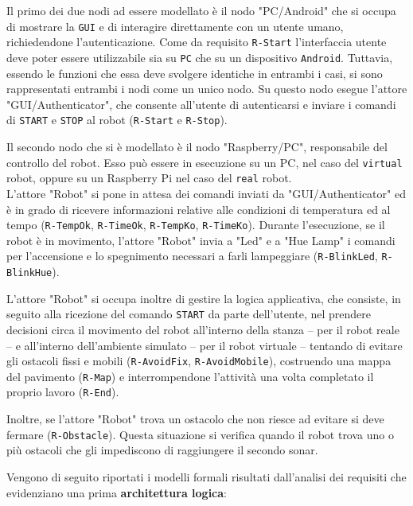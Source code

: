 \documentclass{llncs}
\newcommand{\version}{7}
\newcommand{\action}[1]{\texttt{#1}\xspace}
\newcommand{\code}[1]{{\color{blue}\small{\texttt{#1}}}}
\newcommand{\fname}[1]{{\color{magenta}\small{\texttt{#1}}}}
\begin{document}
Il primo dei due nodi ad essere modellato è il nodo "PC/Android" che si occupa di mostrare la \action{GUI} e di interagire direttamente con un utente umano, richiedendone l'autenticazione. Come da requisito \code{R-Start} l'interfaccia utente deve poter essere utilizzabile sia su \action{PC} che su un dispositivo \action{Android}. Tuttavia, essendo le funzioni che essa deve svolgere identiche in entrambi i casi, si sono rappresentati entrambi i nodi come un unico nodo. Su questo nodo esegue l'attore "GUI/Authenticator", che consente all'utente di autenticarsi e inviare i comandi di \action{START} e \action{STOP} al robot (\code{R-Start} e \code{R-Stop}). 

Il secondo nodo che si è modellato è il nodo "Raspberry/PC", responsabile del controllo del robot. Esso può essere in esecuzione su un PC, nel caso del \fname{virtual} robot, oppure su un Raspberry Pi nel caso del \fname{real} robot. \\ L'attore "Robot" si pone in attesa dei comandi inviati da "GUI/Authenticator" ed è in grado di ricevere informazioni relative alle condizioni di temperatura ed al tempo (\code{R-TempOk}, \code{R-TimeOk}, \code{R-TempKo}, \code{R-TimeKo}). Durante l'esecuzione, se il robot è in movimento, l'attore "Robot" invia a "Led" e a "Hue Lamp" i comandi per l'accensione e lo spegnimento necessari a farli lampeggiare (\code{R-BlinkLed}, \code{R-BlinkHue}). 

L'attore "Robot" si occupa inoltre di gestire la logica applicativa, che consiste, in seguito alla ricezione del comando \action{START} da parte dell'utente, nel prendere decisioni circa il movimento del robot all'interno della stanza – per il robot reale – e all'interno dell'ambiente simulato – per il robot virtuale – tentando di evitare gli ostacoli fissi e mobili (\code{R-AvoidFix}, \code{R-AvoidMobile}), costruendo una mappa del pavimento (\code{R-Map}) e interrompendone l'attività una volta completato il proprio lavoro (\code{R-End}).

Inoltre, se l'attore "Robot" trova un ostacolo che non riesce ad evitare si deve fermare (\code{R-Obstacle}).
Questa situazione si verifica quando il robot trova uno o più ostacoli che gli impediscono di raggiungere il secondo sonar.



Vengono di seguito riportati i modelli formali risultati dall'analisi dei requisiti che evidenziano una prima \textbf{architettura logica}:



\end{document}
